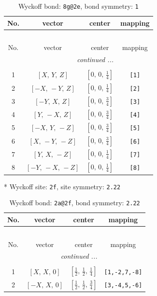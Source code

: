 \documentclass[fleqn,8pt]{jsarticle}
\begin{document}
\begin{longtable}{cccc}
\caption{Wyckoff bond: {\tt 8g@2e}, bond symmetry: {\tt 1}}
 \\
 \hline \hline
No. & vector & center & mapping \\ \hline \endfirsthead

\multicolumn{3}{l}{\tablename\ \thetable{}} \\
 \hline \hline
No. & vector & center & mapping \\ \hline \endhead

 \hline \hline
\multicolumn{3}{r}{\footnotesize\it continued ...} \\ \endfoot

 \hline \hline
\multicolumn{3}{r}{} \\ \endlastfoot

1 & $\left[ X,\, Y,\, Z \right]$ & $\left[ 0,\, 0,\, \frac{1}{4} \right]$ & {\tt [1]} \\ \hline
2 & $\left[ - X,\, - Y,\, Z \right]$ & $\left[ 0,\, 0,\, \frac{1}{4} \right]$ & {\tt [2]} \\ \hline
3 & $\left[ - Y,\, X,\, Z \right]$ & $\left[ 0,\, 0,\, \frac{3}{4} \right]$ & {\tt [3]} \\ \hline
4 & $\left[ Y,\, - X,\, Z \right]$ & $\left[ 0,\, 0,\, \frac{3}{4} \right]$ & {\tt [4]} \\ \hline
5 & $\left[ - X,\, Y,\, - Z \right]$ & $\left[ 0,\, 0,\, \frac{3}{4} \right]$ & {\tt [5]} \\ \hline
6 & $\left[ X,\, - Y,\, - Z \right]$ & $\left[ 0,\, 0,\, \frac{3}{4} \right]$ & {\tt [6]} \\ \hline
7 & $\left[ Y,\, X,\, - Z \right]$ & $\left[ 0,\, 0,\, \frac{1}{4} \right]$ & {\tt [7]} \\ \hline
8 & $\left[ - Y,\, - X,\, - Z \right]$ & $\left[ 0,\, 0,\, \frac{1}{4} \right]$ & {\tt [8]} \\
\end{longtable}
* Wyckoff site: {\tt 2f}, site symmetry: {\tt 2.22}
\renewcommand{\arraystretch}{1.2}
\begin{longtable}{cccc}
\caption{Wyckoff bond: {\tt 2a@2f}, bond symmetry: {\tt 2.22}}
 \\
 \hline \hline
No. & vector & center & mapping \\ \hline \endfirsthead

\multicolumn{3}{l}{\tablename\ \thetable{}} \\
 \hline \hline
No. & vector & center & mapping \\ \hline \endhead

 \hline \hline
\multicolumn{3}{r}{\footnotesize\it continued ...} \\ \endfoot

 \hline \hline
\multicolumn{3}{r}{} \\ \endlastfoot

1 & $\left[ X,\, X,\, 0 \right]$ & $\left[ \frac{1}{2},\, \frac{1}{2},\, \frac{1}{4} \right]$ & {\tt [1,-2,7,-8]} \\ \hline
2 & $\left[ - X,\, X,\, 0 \right]$ & $\left[ \frac{1}{2},\, \frac{1}{2},\, \frac{3}{4} \right]$ & {\tt [3,-4,5,-6]} \\
\end{longtable}
\end{document}
